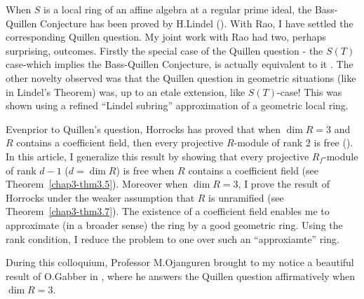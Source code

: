 When $S$ is a local ring of an affine algebra at a regular prime
ideal, the Bass-Quillen Conjecture has been proved by H.\@ Lindel
(\cite[Theorem]{chap3-L-1}). With Rao, I have settled the
corresponding Quillen question. My joint work with Rao had two,
perhaps surprising, outcomes. Firstly the special case of the Quillen
question - the $S(T)$ case-which implies the Bass-Quillen Conjecture,
is actually equivalent to it \cite[Theorem 2.4]{chap3-B-R}. The other
novelty observed was that the Quillen question in geometric situations
(like in Lindel's Theorem) was, up to an etale extension, like
$S(T)$-case! This was shown using a refined ``Lindel subring''
approximation of a geometric local ring.  

Even\pageoriginale prior to Quillen's question, Horrocks has proved
that when $\dim R=3$ and $R$ contains a coefficient field, then every
projective $R$-module of rank 2 is free (\cite[Theorem 2]{chap3-H}). In
this article, I generalize this result by showing that every
projective $R_{f}$-module of rank $d-1$ ($d=\dim R$) is free when $R$
contains a coefficient field (see Theorem~\ref{chap3-thm3.5}). Moreover when $\dim 
R=3$, I prove the result of Horrocks under the weaker assumption that
$R$ is unramified (see Theorem~\ref{chap3-thm3.7}). The existence of a coefficient
field enables me to approximate (in a broader sense) the ring by a
good geometric ring. Using the rank condition, I reduce the problem to
one over such an ``approxiamte'' ring.

During this colloquium, Professor M.\@ Ojanguren brought to my notice
a beautiful result of O.\@ Gabber in \cite{chap3-G}, where he answers
the Quillen question affirmatively when $\dim R=3$.

